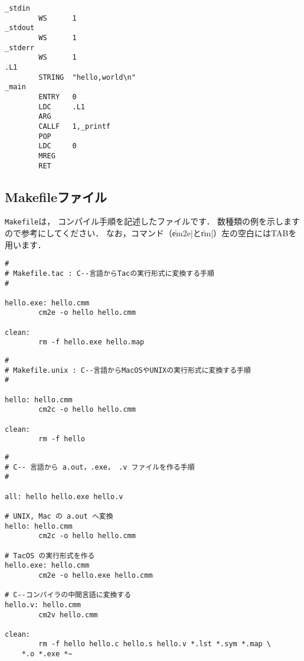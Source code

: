 \begin{itemize}
\begin{mylist}
\begin{verbatim}
_stdin
        WS      1
_stdout
        WS      1
_stderr
        WS      1
.L1
        STRING  "hello,world\n"
_main
        ENTRY   0
        LDC     .L1
        ARG
        CALLF   1,_printf
        POP
        LDC     0
        MREG
        RET
\end{verbatim}
\end{mylist}
\end{itemize}

\subsection{Makefileファイル}

{\tt Makefile}は，
コンパイル手順を記述したファイルです．
数種類の例を示しますので参考にしてください．
なお，コマンド（\|em2e|と\|rm|）左の空白にはTABを用います．

\begin{mylist}
\begin{verbatim}
#
# Makefile.tac : C--言語からTacの実行形式に変換する手順
#

hello.exe: hello.cmm
        cm2e -o hello hello.cmm

clean:
        rm -f hello.exe hello.map
\end{verbatim}
\end{mylist}

\begin{mylist}
\begin{verbatim}
#
# Makefile.unix : C--言語からMacOSやUNIXの実行形式に変換する手順
#

hello: hello.cmm
        cm2c -o hello hello.cmm

clean:
        rm -f hello
\end{verbatim}
\end{mylist}

\begin{mylist}
\begin{verbatim}
#
# C-- 言語から a.out，.exe， .v ファイルを作る手順
#

all: hello hello.exe hello.v

# UNIX, Mac の a.out へ変換
hello: hello.cmm
        cm2c -o hello hello.cmm

# TacOS の実行形式を作る
hello.exe: hello.cmm
        cm2e -o hello.exe hello.cmm

# C--コンパイラの中間言語に変換する
hello.v: hello.cmm
        cm2v hello.cmm

clean:
        rm -f hello hello.c hello.s hello.v *.lst *.sym *.map \
	*.o *.exe *~

\end{verbatim}
\end{mylist}
